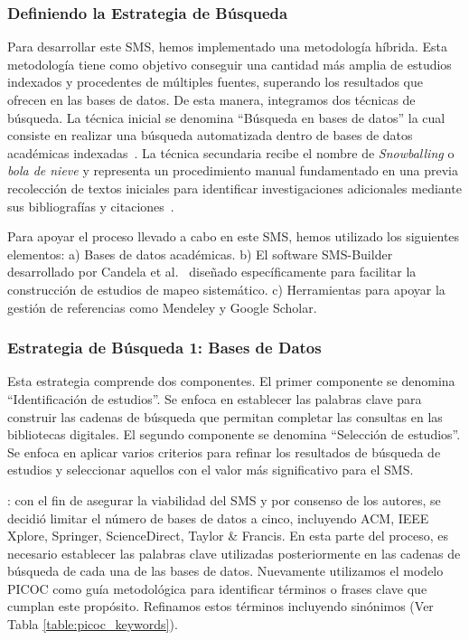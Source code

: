 \subsubsection{Definiendo la Estrategia de Búsqueda}\label{subsubsec:estrategia-busqueda}

Para desarrollar este SMS, hemos implementado una metodología híbrida. Esta metodología tiene como objetivo conseguir una cantidad más
amplia de estudios indexados y procedentes de múltiples fuentes, superando los resultados que ofrecen en las bases de datos. De esta manera, integramos dos técnicas de búsqueda. La técnica inicial se denomina ``Búsqueda en bases de datos'' la cual consiste en realizar una búsqueda automatizada dentro de bases de datos académicas indexadas~\cite{Jalai-01}. La técnica secundaria recibe el
nombre de \textit{Snowballing} o  \textit{bola de nieve} y representa un procedimiento manual fundamentado en una  previa recolección de textos iniciales para
identificar investigaciones adicionales mediante sus bibliografías y citaciones~\cite{Jalai-01,Goodman-01}.

Para apoyar el proceso llevado a cabo en este SMS, hemos utilizado los siguientes elementos: a) Bases de datos académicas. b) El software SMS-Builder desarrollado por Candela et al.~\cite{sms-builder-repo} diseñado específicamente para facilitar la construcción de estudios de mapeo sistemático. c) Herramientas para apoyar la gestión de referencias como Mendeley y Google Scholar. %



\subsubsection{Estrategia de Búsqueda 1: Bases de Datos}

Esta estrategia comprende dos componentes. El primer componente se denomina ``Identificación de estudios''. Se enfoca en establecer las palabras clave para construir las cadenas de búsqueda que permitan completar las consultas en las bibliotecas digitales. El segundo componente se denomina ``Selección de estudios''. Se enfoca en aplicar varios criterios para refinar los resultados de búsqueda de estudios y seleccionar aquellos con el valor más significativo para el SMS.\@

: con el fin de asegurar la viabilidad del SMS y por consenso de los autores, se decidió limitar el número de bases de datos a cinco, incluyendo ACM, IEEE Xplore, Springer, ScienceDirect, Taylor \& Francis. En esta parte del proceso, es necesario establecer las palabras clave utilizadas posteriormente en las cadenas de búsqueda de cada una de las bases de datos. Nuevamente utilizamos el modelo PICOC como guía metodológica para identificar términos o frases clave que cumplan este propósito. Refinamos estos términos incluyendo sinónimos (Ver Tabla \ref{table:picoc_keywords}).

